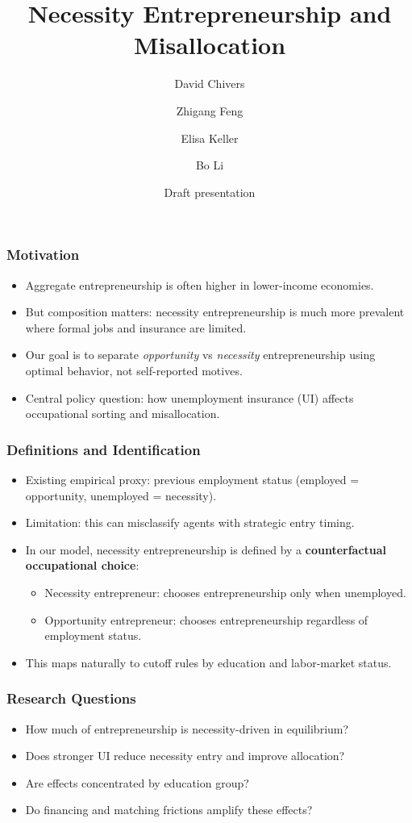 \documentclass[english,aspectratio=169]{beamer}
\title{Necessity Entrepreneurship and Misallocation}
\author[Chivers, Feng, Keller, Li]{David Chivers \and Zhigang Feng \and Elisa Keller \and Bo Li}
\institute{Durham University \and University of Nebraska Omaha \and University of Exeter \and Peking University}
\date{Draft presentation}
\begin{document}
\begin{frame}
\titlepage
\end{frame}

\begin{frame}
\frametitle{Motivation}
\begin{itemize}
\item Aggregate entrepreneurship is often higher in lower-income economies.
\item But composition matters: necessity entrepreneurship is much more prevalent where formal jobs and insurance are limited.
\item Our goal is to separate \textit{opportunity} vs \textit{necessity} entrepreneurship using optimal behavior, not self-reported motives.
\item Central policy question: how unemployment insurance (UI) affects occupational sorting and misallocation.
\end{itemize}
\end{frame}

\begin{frame}
\frametitle{Definitions and Identification}
\begin{itemize}
\item Existing empirical proxy: previous employment status (employed = opportunity, unemployed = necessity).
\item Limitation: this can misclassify agents with strategic entry timing.
\item In our model, necessity entrepreneurship is defined by a \textbf{counterfactual occupational choice}:
\begin{itemize}
\item Necessity entrepreneur: chooses entrepreneurship only when unemployed.
\item Opportunity entrepreneur: chooses entrepreneurship regardless of employment status.
\end{itemize}
\item This maps naturally to cutoff rules by education and labor-market status.
\end{itemize}
\end{frame}

\begin{frame}
\frametitle{Research Questions}
\begin{itemize}
\item How much of entrepreneurship is necessity-driven in equilibrium?
\item Does stronger UI reduce necessity entry and improve allocation?
\item Are effects concentrated by education group?
\item Do financing and matching frictions amplify these effects?
\end{itemize}
\end{frame}
\end{document}
